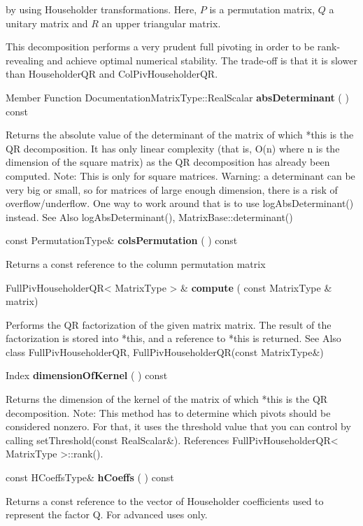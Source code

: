 by using Householder transformations. Here, $P$ is a permutation matrix, $Q$ a unitary matrix and $R$ an upper triangular matrix.

This decomposition performs a very prudent full pivoting in order to be rank-revealing and achieve optimal numerical stability. The trade-off is that it is slower than \textsf{HouseholderQR} and \textsf{ColPivHouseholderQR}.


Member Function DocumentationMatrixType::RealScalar \textbf{absDeterminant}  ( )  const 

Returns the absolute value of the determinant of the matrix of which *this is the QR decomposition. It has only linear complexity (that is, O(n) where n is the dimension of the square matrix) as the QR decomposition has already been computed.
Note: This is only for square matrices.
Warning: a determinant can be very big or small, so for matrices of large enough dimension, there is a risk of overflow/underflow. One way to work around that is to use logAbsDeterminant() instead.
See Also
logAbsDeterminant(), MatrixBase::determinant() 


\vspace{0.3cm}
const PermutationType\& \textbf{colsPermutation}  ( )  const 

Returns a const reference to the column permutation matrix 


\vspace{0.3cm}
FullPivHouseholderQR< MatrixType > \& \textbf{compute}  ( const MatrixType \&  matrix)   

Performs the QR factorization of the given matrix matrix. The result of the factorization is stored into *this, and a reference to *this is returned.
See Also
class FullPivHouseholderQR, FullPivHouseholderQR(const MatrixType\&) 


\vspace{0.3cm}
Index \textbf{dimensionOfKernel}  ( )  const 

Returns the dimension of the kernel of the matrix of which *this is the QR decomposition.
Note: This method has to determine which pivots should be considered nonzero. For that, it uses the threshold value that you can control by calling setThreshold(const RealScalar\&). References FullPivHouseholderQR< MatrixType >::rank().


\vspace{0.3cm}
const HCoeffsType\& \textbf{hCoeffs}  ( )  const 

Returns a const reference to the vector of Householder coefficients used to represent the factor Q.
For advanced uses only. 


